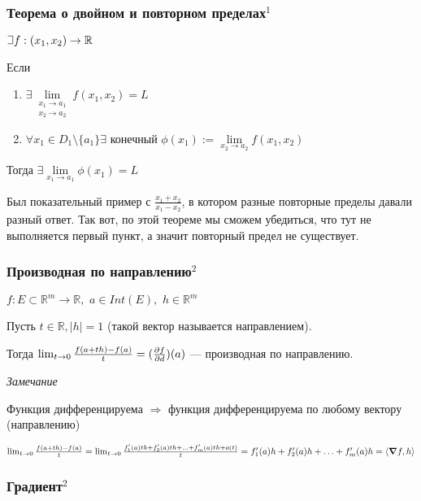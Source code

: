\documentclass{article}
\def\letus{%
\mathord{\setbox0=\hbox{$\exists$}%
         \hbox{\kern 0.125\wd0%
               \vbox to \ht0{%
                  \hrule width 0.75\wd0%
                  \vfill%
                  \hrule width 0.75\wd0}%
               \vrule height \ht0%
               \kern 0.125\wd0}%
       }%
        }
\def\dbl{\,\,}
\begin{document}
\subsubsection{Теорема о двойном и повторном пределах\texorpdfstring{$^1$}{}}
$\letus f: (x_1, x_2) \rightarrow \mathbb{R}$

Если
\begin{enumerate}
    \item $\exists \lim\limits_{\begin{array}{c} x_1\rightarrow a_1 \\ x_2 \rightarrow a_2 \end{array}} f(x_1, x_2) = L$
    \item $\forall x_1 \in D_1 \setminus \{a_1\} \exists$ конечный $\phi(x_1) := \lim\limits_{x_2\rightarrow a_2} f(x_1, x_2)$
\end{enumerate}
Тогда $\exists \lim\limits_{x_1\rightarrow a_1} \phi(x_1) = L$

Был показательный пример с $\frac{x_1+x_2}{x_1-x_2}$, в котором разные повторные пределы давали разный ответ. Так вот, по этой теореме мы сможем убедиться, что тут не выполняется первый пункт, а значит повторный предел не существует.

\subsubsection{Производная по направлению\texorpdfstring{$^2$}{}}

$f: E \subset \mathbb{R}^m \rightarrow \mathbb{R}, \dbl a \in Int(E), \dbl h \in \mathbb{R}^m$

Пусть $t \in \mathbb{R}, |h| = 1$ (такой вектор  называется направлением).

Тогда $\lim_{t \rightarrow 0}{\frac{f(a + th) - f(a)}{t}} = (\pdv{f}{d})(a)$ --- производная по направлению. 

\textit{Замечание}

Функция дифференцируема $\Rightarrow$ функция дифференцируема по любому вектору (направлению)

$\lim_{t \rightarrow 0}{\frac{f(a + th) - f(a)}{t}} = \lim_{t \rightarrow 0}{\frac{f^\prime_1(a)th + f^\prime_2(a)th + \ldots + f^\prime_m(a)th + o(t)}{t}} = f^\prime_1(a)h + f^\prime_2(a)h + \ldots + f^\prime_m(a)h = \langle \grad f, h \rangle$

\subsubsection{Градиент\texorpdfstring{$^2$}{}}
\end{document}
